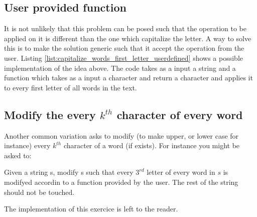 \subsection{User provided function}
It is not unlikely that this problem can be posed such that the operation to be applied on it is different than the one which capitalize the letter. A way to solve this is to make the solution generic such that it accept the operation from the user.  Listing \ref{list:capitalize_words_first_letter_userdefined} shows a possible implementation of the idea above. The code takes as a input a string and a function which takes as a input a character and return a character and applies it to every first letter of all words in the text.




\subsection{Modify the every $k^{th}$ character of every word}
Another common variation asks to modify (to make upper, or lower case for instance) every $k^{th}$ character of a word (if exists). For instance you might be asked to:

\begin{exercise}
Given a string s, modify s such that every $3^{rd}$ letter of every word in $s$ is modifyed accordin to a function provided by the user. The rest of the string should not be touched.
\end{exercise}
The implementation of this exercice is left to the reader.

